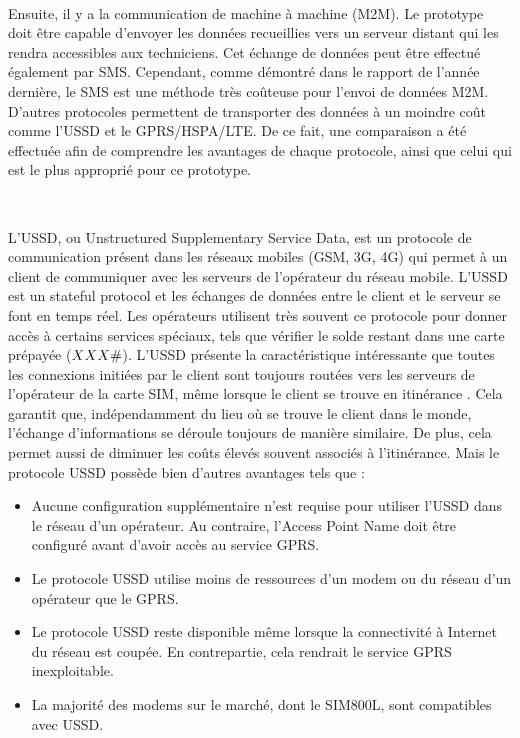 ~

\noindent
Ensuite, il y a la communication de machine à machine (M2M). Le prototype doit être capable d'envoyer les données recueillies vers un serveur distant qui les rendra accessibles aux techniciens. Cet échange de données peut être effectué également par SMS. Cependant, comme démontré dans le rapport de l'année dernière, le SMS est une méthode très coûteuse pour l'envoi de données M2M. D'autres protocoles permettent de transporter des données à un moindre coût comme l'USSD et le GPRS/HSPA/LTE. De ce fait, une comparaison a été effectuée afin de comprendre les avantages de chaque protocole, ainsi que celui qui est le plus approprié pour ce prototype.


~

\noindent
L'USSD, ou Unstructured Supplementary Service Data, est un protocole de communication présent dans les réseaux mobiles (GSM, 3G, 4G) qui permet à un client de communiquer avec les serveurs de l'opérateur du réseau mobile. L'USSD est un stateful protocol et les échanges de données entre le client et le serveur se font en temps réel.  Les opérateurs utilisent très souvent ce protocole pour donner accès à certains services spéciaux, tels que vérifier le solde restant dans une carte prépayée ($\*XXX\#$). L'USSD présente la caractéristique intéressante que toutes les connexions initiées par le client sont toujours routées vers les serveurs de l'opérateur de la carte SIM, même lorsque le client se trouve en itinérance \cite{lakshmi2017ussd}. Cela garantit que, indépendamment du lieu où se trouve le client dans le monde, l'échange d'informations se déroule toujours de manière similaire. De plus, cela permet aussi de diminuer les coûts élevés souvent associés à l'itinérance. Mais le protocole USSD possède bien d'autres avantages tels que :


\begin{itemize}
  \item Aucune configuration supplémentaire n'est requise pour utiliser l'USSD dans le réseau d'un opérateur. Au contraire, l'Access Point Name doit être configuré avant d'avoir accès au service GPRS.

  \item Le protocole USSD utilise moins de ressources d'un modem ou du réseau d'un opérateur que le GPRS. \cite{global_ussd}

  \item Le protocole USSD reste disponible même lorsque la connectivité à Internet du réseau est coupée. En contrepartie, cela rendrait le service GPRS inexploitable.\cite{transport_ussd}

  \item La majorité des modems sur le marché, dont le SIM800L, sont compatibles avec USSD. \cite{lakshmi2017ussd}
\end{itemize}

